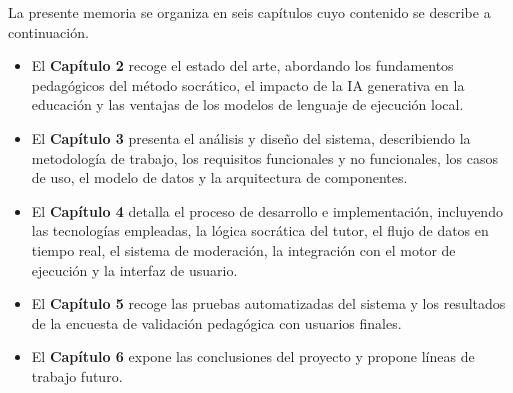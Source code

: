 La presente memoria se organiza en seis capítulos cuyo contenido se describe a continuación.

\begin{itemize}
    \item[--] El \textbf{Capítulo 2} recoge el estado del arte, abordando los fundamentos pedagógicos del método socrático, el impacto de la IA generativa en la educación y las ventajas de los modelos de lenguaje de ejecución local.

    \item[--] El \textbf{Capítulo 3} presenta el análisis y diseño del sistema, describiendo la metodología de trabajo, los requisitos funcionales y no funcionales, los casos de uso, el modelo de datos y la arquitectura de componentes.

    \item[--] El \textbf{Capítulo 4} detalla el proceso de desarrollo e implementación, incluyendo las tecnologías empleadas, la lógica socrática del tutor, el flujo de datos en tiempo real, el sistema de moderación, la integración con el motor de ejecución y la interfaz de usuario.

    \item[--] El \textbf{Capítulo 5} recoge las pruebas automatizadas del sistema y los resultados de la encuesta de validación pedagógica con usuarios finales.

    \item[--] El \textbf{Capítulo 6} expone las conclusiones del proyecto y propone líneas de trabajo futuro.
\end{itemize}
